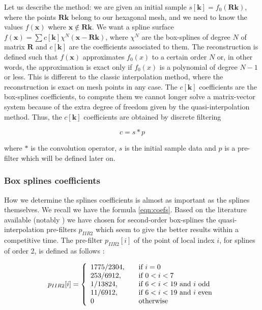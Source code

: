 \documentclass[proc]{edpsmath}
\begin{document}
Let us describe the method: we are given an initial sample $s[\mathbf{k}] = f_0(\mathbf{R} \mathbf{k})$, where the points $\mathbf{R} \mathbf{k}$ belong to our hexagonal mesh, and we need to know the values $f(\mathbf{x})$ where $\mathbf{x} \notin \mathbf{R} \mathbf{k}$. We want a spline surface $f(\mathbf{x}) = \sum c[\mathbf{k}] \chi^N(\mathbf{x} - \mathbf{R}\mathbf{k})$, where $\chi^N$ are the box-splines of degree $N$ of matrix $\mathbf{R}$ and $c[\mathbf{k}]$ are the coefficients associated to them. The reconstruction is defined such that $f(\mathbf{x})$ approximates $f_0(x)$ to a certain order $N$ or, in other words, the approximation is exact only if $f_0(x)$ is a polynomial of degree $N-1$ or less. This is different to the classic interpolation method, where the reconstruction is exact on mesh points in any case. The $c[\mathbf{k}]$ coefficients are the box-splines coefficients, to compute them we cannot longer solve a matrix-vector system because of the extra degree of freedom given by the quasi-interpolation method. Thus, the  $c[\mathbf{k}]$ coefficients are obtained by discrete filtering\cite{Condat2006a}

\begin{equation}
\label{eqn:coefs}
 c = s * p
\end{equation}

where $*$ is the convolution operator, $s$ is the initial sample data and $p$ is a pre-filter which will be defined later on.


\subsubsection{Box splines coefficients}

How we determine the splines coefficients is almost as important as the splines themselves. We recall we have the formula \eqref{eqn:coefs}. Based on the literature available (notably \cite{Condat2007}) we have chosen for second-order box-splines the quasi-interpolation pre-filters $p_{IIR2}$ which seem to give the better results within a competitive time. The pre-filter $p_{IIR2}[i]$ of the point of local index $i$, for splines of order 2, is defined as follows : 


\begin{equation}
\label{eqn:filterIIR2}
p_{IIR2} [i] = \left\{
  \begin{array}{l l}
    1775/2304\text{,} & \quad \text{if } i = 0\\
    253/6912\text{,} & \quad \text{if } 0<i<7\\
    1/13824\text{,} & \quad \text{if } 6<i<19 \text{ and $i$ odd}\\
    11/6912\text{,} & \quad \text{if } 6<i<19 \text{ and $i$ even}\\
    0 & \quad \text{otherwise}
  \end{array} \right.
\end{equation}
\end{document}
